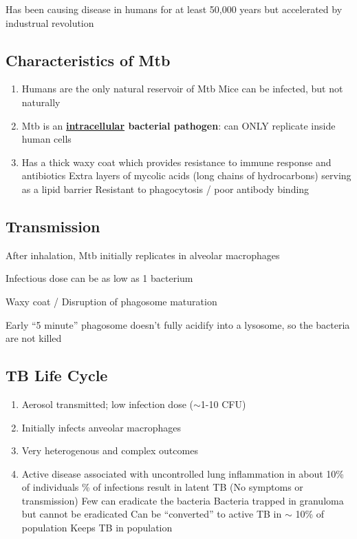 \documentclass{notes}
\begin{document}
Has been causing disease in humans for at least 50,000 years but accelerated by industrual revolution

\subsection*{Characteristics of Mtb}
\begin{enumerate}
    \item Humans are the only natural reservoir of Mtb
    \subitem Mice can be infected, but not naturally
    \item Mtb is an \textbf{\underline{intracellular} bacterial pathogen}: can ONLY replicate inside human cells
    \item Has a thick waxy coat which provides resistance to immune response and antibiotics
    \subitem Extra layers of mycolic acids (long chains of hydrocarbons) serving as a lipid barrier
    \subitem Resistant to phagocytosis / poor antibody binding
\end{enumerate}

\subsection*{Transmission}
After inhalation, Mtb initially replicates in alveolar macrophages

\tab \indicates Infectious dose can be as low as 1 bacterium

\tab \indicates Waxy coat / Disruption of phagosome maturation

Early ``5 minute'' phagosome doesn't fully acidify into a lysosome, so the bacteria are not killed

\subsection*{TB Life Cycle}

\begin{enumerate}
    \item Aerosol transmitted; low infection dose (\(\sim\)1-10 CFU)
    \item Initially infects anveolar macrophages
    \item Very heterogenous and complex outcomes
    \item Active disease associated with uncontrolled lung inflammation in about 10\% of individuals
    \% of infections result in latent TB (No symptoms or transmission)
    \subsubitem Few can eradicate the bacteria
    \subsubitem Bacteria trapped in granuloma but cannot be eradicated
    \subsubitem Can be ``converted'' to active TB in \(\sim\) 10\% of population
    \subsubitem Keeps TB in population
\end{enumerate}
\end{document}
